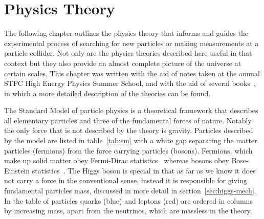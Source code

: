 \chapter{Physics Theory}%
\label{ch:theory}

The following chapter outlines the physics theory that informs and guides the
experimental process of searching for new particles or making measurements at
a particle collider. Not only are the physics theories described here useful in
that context but they also provide an almost complete picture of the universe at
certain scales. This chapter was written with the aid of notes taken at the
annual STFC High Energy Physics Summer School, and with the aid of several
books~\cite{halzen, thomson_2013}, in which a more detailed description of the
theories can be found.

The Standard Model of particle physics is a theoretical framework that describes
all elementary particles and three of the fundamental forces of nature. Notably
the only force that is not described by the theory is gravity. Particles
described by the model are listed in table~\ref{tab:sm} with a white gap
separating the matter particles (fermions) from the force carrying particles
(bosons). Fermions, which make up solid matter obey Fermi-Dirac
statistics~\cite{Fermi-stat, Dirac-stat} whereas bosons obey Bose-Einstein
statistics~\cite{Bose-Einstein}. The Higgs boson is special in that as far as we
know it does not carry a force in the conventional sense, instead it is
responsible for giving fundamental particles mass, discussed in more detail in
section~\ref{sec:higgs-mech}. In the table of particles quarks (blue) and
leptons (red) are ordered in columns by increasing mass, apart from the
neutrinos, which are massless in the theory.



